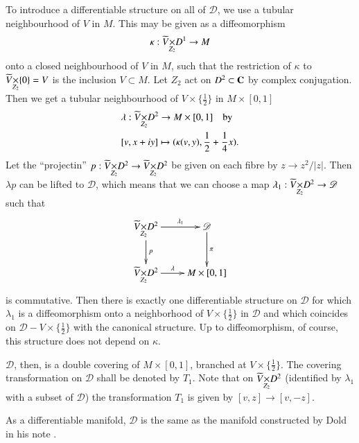 To introduce a differentiable structure on all of $\mathscr{D}$, we use a tubular neighbourhood of $V$ in $M$. This may be given as a diffeomorphism
$$
\kappa : \fprod{\widetilde{V}}{D^{1}}{Z_{2}}\to M
$$
onto a closed neighbourhood of $V$ in $M$, such that the restriction of $\kappa$ to $\fprod{\widetilde{V}}{\{0\}}{Z_{2}}=V$ is the inclusion $V\subset M$. Let $Z_{2}$ act on $D^{2}\subset \mathbf{C}$ by complex conjugation. Then we get a tubular neighbourhood of $V\times \{\frac{1}{2}\}$ in $M\times [0,1]$
\setcounter{equation}{0}
\begin{equation}
\begin{split}
&\lambda : \fprod{\widetilde{V}}{D^{2}}{Z_{2}}\to M\times [0,1]\quad\text{by}\\
&[v,x+iy]\mapsto (\kappa(v,y),\frac{1}{2}+\frac{1}{4}x).
\end{split}
\label{art11-sec2-eq1}
\end{equation}
Let the ``projectin'' $p:\fprod{\widetilde{V}}{D^{2}}{Z_{2}}\to \fprod{\widetilde{V}}{D^{2}}{Z_{2}}$ be given on each fibre by $z\to z^{2}/|z|$. Then $\lambda p$ can be lifted to $\mathscr{D}$, which means that we can choose a map $\lambda_{1}:\fprod{\widetilde{V}}{D^{2}}{Z_{2}}\to \mathscr{D}$ such that
\begin{equation}
\vcenter{\xymatrix{
\fprod{\widetilde{V}}{D^{2}}{Z_{2}}\ar[d]^-{p}\ar[r]^-{\lambda_{1}} & \mathscr{D}\ar[d]^-{\pi}\\
\fprod{\widetilde{V}}{D^{2}}{Z_{2}}\ar[r]^-{\lambda} & M\times [0,1]
}}\label{art11-sec2-eq2}
\end{equation}
is commutative. Then there is exactly one differentiable structure on $\mathscr{D}$ for which $\lambda_{1}$ is a diffeomorphism onto a neighborhood of $V\times \{\frac{1}{2}\}$ in $\mathscr{D}$ and which coincides on $\mathscr{D}-V\times \{\frac{1}{2}\}$ with the canonical structure. Up to diffeomorphism, of course, this structure does not depend on $\kappa$.

$\mathscr{D}$, then, is a double covering of $M\times [0,1]$, branched at $V\times \{\frac{1}{2}\}$. The covering transformation on $\mathscr{D}$ shall be denoted by $T_{1}$. Note that on $\fprod{\widetilde{V}}{D^{2}}{Z_{2}}$ (identified by $\lambda_{1}$ with a subset of $\mathscr{D}$) the transformation $T_{1}$ is given by $[v,z]\to [v,-z]$.

As a differentiable manifold, $\mathscr{D}$ is the same as the manifold constructed by Dold in his note \cite{art11-key5}.

